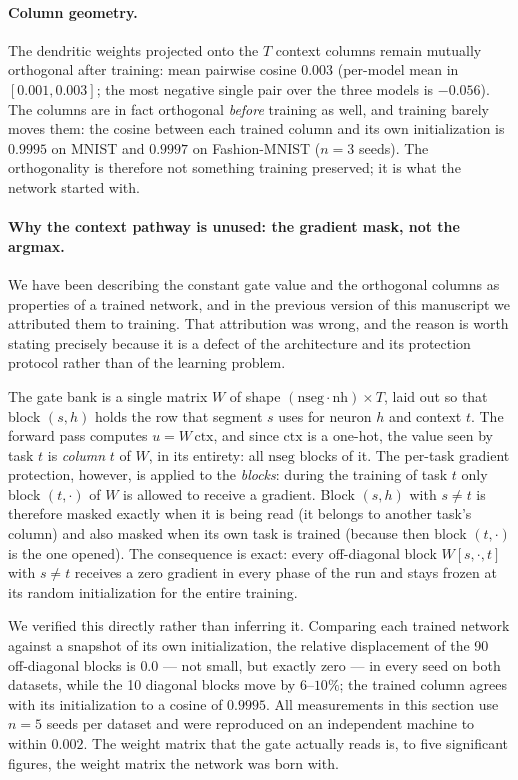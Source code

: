 \documentclass[review,12pt,number]{elsarticle}
\begin{document}
\paragraph{Column geometry.} The dendritic weights projected onto the
$T$ context columns remain mutually orthogonal after training: mean
pairwise cosine $0.003$ (per-model mean in $[0.001, 0.003]$; the most
negative single pair over the three models is $-0.056$). The columns are
in fact orthogonal \emph{before} training as well, and training barely
moves them: the cosine between each trained column and its own
initialization is $0.9995$ on MNIST and $0.9997$ on Fashion-MNIST
($n=3$ seeds). The orthogonality is therefore not something training
preserved; it is what the network started with.

\paragraph{Why the context pathway is unused: the gradient mask, not the
argmax.} We have been describing the constant gate value and the
orthogonal columns as properties of a trained network, and in the
previous version of this manuscript we attributed them to training. That
attribution was wrong, and the reason is worth stating precisely because
it is a defect of the architecture and its protection protocol rather
than of the learning problem.

The gate bank is a single matrix $W$ of shape
$(\text{nseg}\cdot\text{nh}) \times T$, laid out so that block
$(s, h)$ holds the row that segment $s$ uses for neuron $h$ and context
$t$. The forward pass computes $u = W\,\mathrm{ctx}$, and since
$\mathrm{ctx}$ is a one-hot, the value seen by task $t$ is
\emph{column} $t$ of $W$, in its entirety: all $\text{nseg}$ blocks of
it. The per-task gradient protection, however, is applied to the
\emph{blocks}: during the training of task $t$ only block $(t, \cdot)$ of
$W$ is allowed to receive a gradient. Block $(s, h)$ with $s \ne t$ is
therefore masked exactly when it is being read (it belongs to another
task's column) and also masked when its own task is trained (because
then block $(t,\cdot)$ is the one opened). The consequence is exact:
every off-diagonal block $W[s, \cdot, t]$ with $s \ne t$ receives a zero
gradient in every phase of the run and stays frozen at its random
initialization for the entire training.

We verified this directly rather than inferring it. Comparing each
trained network against a snapshot of its own initialization, the
relative displacement of the 90 off-diagonal blocks is
$0.0$ --- not small, but exactly zero --- in every seed on both
datasets, while the 10 diagonal blocks move by $6$--$10\%$; the trained
column agrees with its initialization to a cosine of $0.9995$. All
measurements in this section use $n=5$ seeds per dataset and were
reproduced on an independent machine to within $0.002$. The
weight matrix that the gate actually reads is, to five significant
figures, the weight matrix the network was born with.
\end{document}
